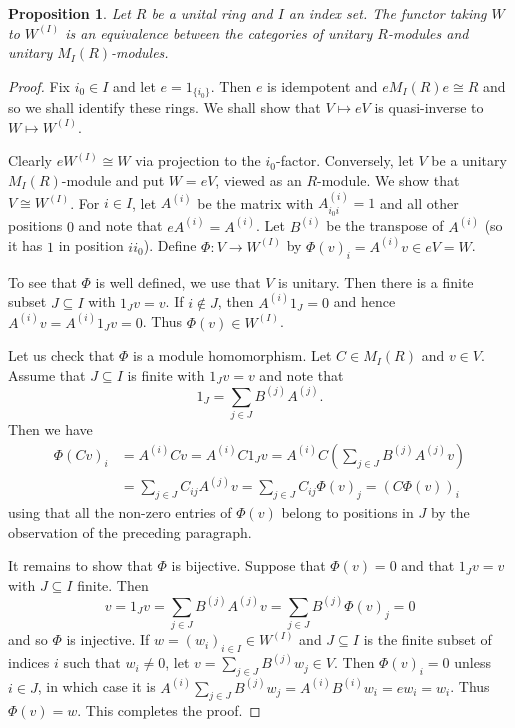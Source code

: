 \documentclass[11pt,reqno]{amsart}
\theoremstyle{plain}
\newtheorem{prop}[thm]{Proposition}
\numberwithin{equation}{section}
\begin{document}
\begin{prop}\label{p:morita.matrix}
Let $R$ be a unital ring and $I$ an index set. The functor taking $W$ to $W^{(I)}$ is an equivalence between the categories of unitary $R$-modules and unitary $M_I(R)$-modules.
\end{prop}
\begin{proof}
Fix $i_0\in I$ and let $e=1_{\{i_0\}}$. Then $e$ is idempotent and $eM_I(R)e\cong R$ and so we shall identify these rings.  We shall show that $V\mapsto eV$ is  quasi-inverse to $W\mapsto W^{(I)}$.

Clearly $eW^{(I)}\cong W$ via projection to the $i_0$-factor.  Conversely, let $V$ be a unitary $M_I(R)$-module and put $W=eV$, viewed as an $R$-module.  We show that $V\cong W^{(I)}$.  For $i\in I$, let $A^{(i)}$ be the matrix with $A^{(i)}_{i_0i}=1$ and all other positions $0$ and note that $eA^{(i)}=A^{(i)}$.  Let $B^{(i)}$ be the transpose of $A^{(i)}$ (so it has $1$ in position $ii_0$).  Define $\Phi\colon V\to W^{(I)}$ by $\Phi(v)_i = A^{(i)}v\in eV=W$.

To see that $\Phi$ is well defined, we use that $V$ is unitary.  Then there is a finite subset $J\subseteq I$ with $1_Jv=v$.  If $i\notin J$, then $A^{(i)}1_J=0$ and hence $A^{(i)}v=  A^{(i)}1_Jv=0$.  Thus $\Phi(v)\in W^{(I)}$.

Let us check that $\Phi$ is a module homomorphism.  Let $C\in M_I(R)$ and $v\in V$.  Assume that $J\subseteq I$ is finite with $1_Jv=v$ and note that \[1_J = \sum_{j\in J}B^{(j)}A^{(j)}.\]   Then we have
\begin{align*}
\Phi(Cv)_i &= A^{(i)}Cv = A^{(i)}C1_Jv = A^{(i)}C\left(\sum_{j\in J}B^{(j)}A^{(j)}v\right) \\ &= \sum_{j\in J}C_{ij}A^{(j)}v = \sum_{j\in J}C_{ij}\Phi(v)_j = (C\Phi(v))_i
\end{align*}
using that all the non-zero entries of $\Phi(v)$ belong to positions in $J$ by the observation of the preceding paragraph.

It remains to show that $\Phi$ is bijective.  Suppose that $\Phi(v)=0$ and that $1_Jv=v$ with $J\subseteq I$ finite.  Then \[v=1_Jv =  \sum_{j\in J}B^{(j)}A^{(j)}v= \sum_{j\in J}B^{(j)}\Phi(v)_j=0\] and so $\Phi$ is injective.  If $w=(w_i)_{i\in I}\in W^{(I)}$ and $J\subseteq I$ is the finite subset of indices $i$ such that $w_i\neq 0$, let $v=\sum_{j\in J}B^{(j)}w_j\in V$.  Then $\Phi(v)_i=0$ unless  $i\in J$, in which case it is $A^{(i)}\sum_{j\in J}B^{(j)}w_j=A^{(i)}B^{(i)}w_i=ew_i=w_i$.  Thus $\Phi(v)=w$.  This completes the proof.
\end{proof}
\end{document}
